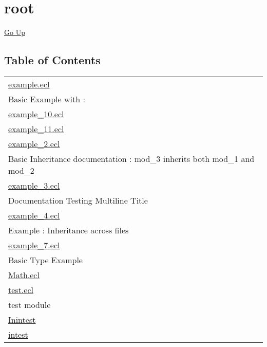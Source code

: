 \chapter*{\color{headtoc} root}
\hypertarget{ecldoc:toc:root}{}
\hyperlink{ecldoc:toc:}{Go Up}


\section*{Table of Contents}
{\renewcommand{\arraystretch}{1.5}
\begin{longtable}{|p{\textwidth}|}
\hline
\hyperlink{ecldoc:toc:example}{example.ecl} \\
Basic Example with : \\
\hline
\hyperlink{ecldoc:toc:example_10}{example\_10.ecl} \\
\hline
\hyperlink{ecldoc:toc:example_11}{example\_11.ecl} \\
\hline
\hyperlink{ecldoc:toc:example_2}{example\_2.ecl} \\
Basic Inheritance documentation : mod\_3 inherits both mod\_1 and mod\_2 \\
\hline
\hyperlink{ecldoc:toc:example_3}{example\_3.ecl} \\
Documentation Testing Multiline Title \\
\hline
\hyperlink{ecldoc:toc:example_4}{example\_4.ecl} \\
Example : Inheritance across files \\
\hline
\hyperlink{ecldoc:toc:example_7}{example\_7.ecl} \\
Basic Type Example \\
\hline
\hyperlink{ecldoc:toc:Math}{Math.ecl} \\
\hline
\hyperlink{ecldoc:toc:test}{test.ecl} \\
test module \\
\hline
\hyperlink{ecldoc:toc:root/Inintest}{Inintest} \\
\hline
\hyperlink{ecldoc:toc:root/intest}{intest} \\
\hline
\end{longtable}
}












